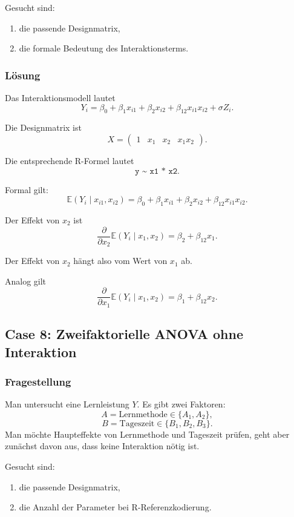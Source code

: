 \documentclass[10pt, letterpaper]{article}
\begin{document}
Gesucht sind:
\begin{enumerate}
    \item die passende Designmatrix,
    \item die formale Bedeutung des Interaktionsterms.
\end{enumerate}

\subsubsection*{Lösung}

Das Interaktionsmodell lautet
\[
Y_i
=
\beta_0+\beta_1x_{i1}+\beta_2x_{i2}
+\beta_{12}x_{i1}x_{i2}
+\sigma Z_i.
\]

Die Designmatrix ist
\[
X=
\begin{pmatrix}
1 & x_1 & x_2 & x_1x_2
\end{pmatrix}.
\]

Die entsprechende R-Formel lautet
\[
\texttt{y \textasciitilde{} x1 * x2}.
\]

Formal gilt:
\[
\mathbb E(Y_i\mid x_{i1},x_{i2})
=
\beta_0+\beta_1x_{i1}+\beta_2x_{i2}
+\beta_{12}x_{i1}x_{i2}.
\]

Der Effekt von \(x_2\) ist
\[
\frac{\partial}{\partial x_2}
\mathbb E(Y_i\mid x_1,x_2)
=
\beta_2+\beta_{12}x_1.
\]

Der Effekt von \(x_2\) hängt also vom Wert von \(x_1\) ab.

Analog gilt
\[
\frac{\partial}{\partial x_1}
\mathbb E(Y_i\mid x_1,x_2)
=
\beta_1+\beta_{12}x_2.
\]

\subsection{Case 8: Zweifaktorielle ANOVA ohne Interaktion}

\subsubsection*{Fragestellung}

Man untersucht eine Lernleistung \(Y\). Es gibt zwei Faktoren:
\[
A=\text{Lernmethode}\in\{A_1,A_2\},
\]
\[
B=\text{Tageszeit}\in\{B_1,B_2,B_3\}.
\]
Man möchte Haupteffekte von Lernmethode und Tageszeit prüfen, geht aber zunächst davon aus, dass keine Interaktion nötig ist.

Gesucht sind:
\begin{enumerate}
    \item die passende Designmatrix,
    \item die Anzahl der Parameter bei R-Referenzkodierung.
\end{enumerate}
\end{document}
